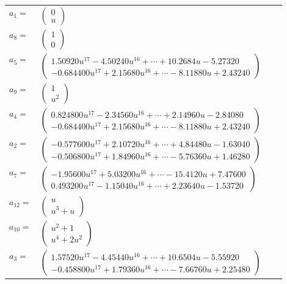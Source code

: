 \documentclass[1p]{elsarticle_modified}
\theoremstyle{definition}
\begin{document}
\begin{tabular}{m{7pt} m{180pt} m{7pt} m{180pt} }
\flushright $a_{1}=$&$\begin{pmatrix}0\\u\end{pmatrix}$ \\
\flushright $a_{8}=$&$\begin{pmatrix}1\\0\end{pmatrix}$ \\
\flushright $a_{5}=$&$\begin{pmatrix}1.50920 u^{17}-4.50240 u^{16}+\cdots+10.2684 u-5.27320\\-0.684400 u^{17}+2.15680 u^{16}+\cdots-8.11880 u+2.43240\end{pmatrix}$ \\
\flushright $a_{9}=$&$\begin{pmatrix}1\\u^2\end{pmatrix}$ \\
\flushright $a_{4}=$&$\begin{pmatrix}0.824800 u^{17}-2.34560 u^{16}+\cdots+2.14960 u-2.84080\\-0.684400 u^{17}+2.15680 u^{16}+\cdots-8.11880 u+2.43240\end{pmatrix}$ \\
\flushright $a_{2}=$&$\begin{pmatrix}-0.577600 u^{17}+2.10720 u^{16}+\cdots+4.84480 u-1.63040\\-0.506800 u^{17}+1.84960 u^{16}+\cdots-5.76360 u+1.46280\end{pmatrix}$ \\
\flushright $a_{7}=$&$\begin{pmatrix}-1.95600 u^{17}+5.03200 u^{16}+\cdots-15.4120 u+7.47600\\0.493200 u^{17}-1.15040 u^{16}+\cdots+2.23640 u-1.53720\end{pmatrix}$ \\
\flushright $a_{12}=$&$\begin{pmatrix}u\\u^3+u\end{pmatrix}$ \\
\flushright $a_{10}=$&$\begin{pmatrix}u^2+1\\u^4+2 u^2\end{pmatrix}$ \\
\flushright $a_{3}=$&$\begin{pmatrix}1.57520 u^{17}-4.45440 u^{16}+\cdots+10.6504 u-5.55920\\-0.458800 u^{17}+1.79360 u^{16}+\cdots-7.66760 u+2.25480\end{pmatrix}$ \\

\end{tabular}
\end{document}
